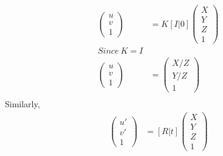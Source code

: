 \documentclass{article}
\begin{document}
\begin{align*}
\begin{pmatrix} u\\ v\\ 1 \end{pmatrix} &= K [I | 0] \begin{pmatrix} X\\ Y\\ Z\\ 1 \end{pmatrix} \\
Since\ K = I \\
\begin{pmatrix} u\\ v\\ 1 \end{pmatrix} &= \begin{pmatrix} X/Z\\ Y/Z\\ 1 \end{pmatrix} \\
\end{align*}
Similarly,
\begin{align*}
\begin{pmatrix} u'\\ v'\\ 1 \end{pmatrix} &=  [R | t] \begin{pmatrix} X\\ Y\\ Z\\ 1 \end{pmatrix} \\
\end{align*}
\end{document}
